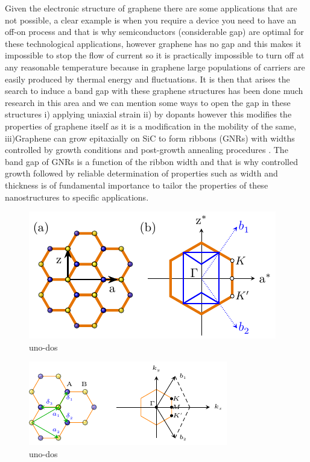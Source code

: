 Given the electronic structure of graphene there are some applications that are not possible, a clear example is when you require a device you need to have an off-on process and that is why semiconductors (considerable gap) are optimal for these technological applications, however graphene has no gap and this makes it impossible to stop the flow of current so it is practically impossible to turn off at any reasonable temperature because in graphene large populations of carriers are easily produced by thermal energy and fluctuations. It is then that arises the search to induce a band gap with these graphene structures has been done much research in this area and we can mention some ways to open the gap in these structures i) applying uniaxial strain \cite{ni2008uniaxial}  ii) by dopants however this modifies the properties of graphene itself as it is a modification in the mobility of the same, iii)Graphene can grow epitaxially on SiC to form ribbons (GNRs) with widths controlled by growth conditions and post-growth annealing procedures \cite{celis2016graphene,baringhaus2014exceptional,sprinkle2010scalable}. The band gap of GNRs is a function of the ribbon width and that is why controlled growth followed by reliable determination of properties such as width and thickness is of fundamental importance to tailor the properties of these nanostructures to specific applications\cite{flores2021optical}.


\begin{figure}[H]
	\centering
	\includegraphics[width=0.82\linewidth]{FIGURES/Physical_Background/Teoria_Fig5.pdf}
	\caption{uno-dos}
	\label{fig:sq-how to reflex}
\end{figure}


\begin{figure}[H]
	\centering
	\includegraphics[width=0.85\linewidth]{FIGURES/Physical_Background/Teo_fig1.pdf}
	\caption{uno-dos}
	\label{fig:sq-how to reflex}
\end{figure}

